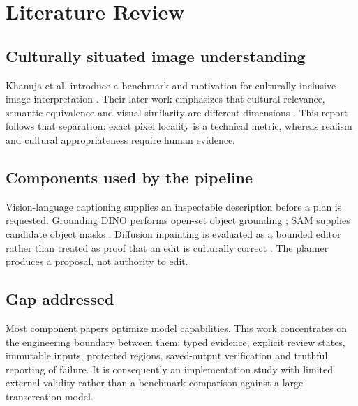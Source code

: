 \chapter{Literature Review}
\label{ch:literature}
\section{Culturally situated image understanding}
Khanuja et al. introduce a benchmark and motivation for culturally inclusive image interpretation \cite{khanuja2024image}. Their later work emphasizes that cultural relevance, semantic equivalence and visual similarity are different dimensions \cite{khanuja2025evaluating}. This report follows that separation: exact pixel locality is a technical metric, whereas realism and cultural appropriateness require human evidence.

\section{Components used by the pipeline}
Vision-language captioning supplies an inspectable description before a plan is requested. Grounding DINO performs open-set object grounding \cite{liu2023groundingdino}; SAM supplies candidate object masks \cite{kirillov2023sam}. Diffusion inpainting is evaluated as a bounded editor rather than treated as proof that an edit is culturally correct \cite{rombach2022ldm,podell2023sdxl}. The planner produces a proposal, not authority to edit.

\section{Gap addressed}
Most component papers optimize model capabilities. This work concentrates on the engineering boundary between them: typed evidence, explicit review states, immutable inputs, protected regions, saved-output verification and truthful reporting of failure. It is consequently an implementation study with limited external validity rather than a benchmark comparison against a large transcreation model.
